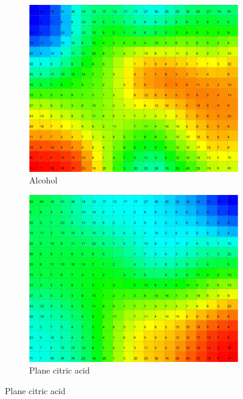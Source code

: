 \documentclass{acm_proc_article-sp}
\begin{document}
\begin{figure}
\centering
    \centering
    \begin{subfigure}[b]{0.48\linewidth}
        \includegraphics[width=\linewidth]{img/wine-newmid-thematic-component-plane-alcohol}
        \caption{Alcohol}
        \label{fig:wine-newmid-thematic-component-plane-alcohol}
    \end{subfigure}
    \begin{subfigure}[b]{0.48\linewidth}
        \includegraphics[width=\linewidth]{img/wine-newmid-thematic-component-plane-citric-acid}
        \caption{Plane citric acid}
        \label{fig:wine-newmid-thematic-component-plane-citric-acid}

\end{subfigure}
\end{figure}
\end{document}
